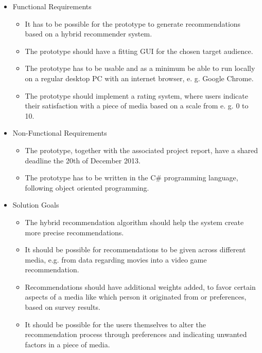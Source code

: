 \begin{itemize}
	\item Functional Requirements
	\begin{itemize}
		\item It has to be possible for the prototype to generate recommendations based on a hybrid recommender system.
		\item The prototype should have a fitting GUI for the chosen target audience.
		\item The prototype has to be usable and as a minimum be able to run locally on a regular desktop PC with an internet browser, e. g. Google Chrome.
		\item The prototype should implement a rating system, where users indicate their satisfaction with a piece of media based on a scale from e. g. 0 to 10.
	\end{itemize}
	\item Non-Functional Requirements
	\begin{itemize}
		\item The prototype, together with the associated project report, have a shared deadline the 20th of December 2013.
		\item The prototype has to be written in the C\# programming language, following object oriented programming.
	\end{itemize}
	\item Solution Goals
	\begin{itemize}
		\item The hybrid recommendation algorithm should help the system create more precise recommendations.
		\item It should be possible for recommendations to be given across different media, e.g. from data regarding movies into a video game recommendation.
		\item Recommendations should have additional weights added, to favor certain aspects of a media like which person it originated from or preferences, based on survey results.
		\item It should be possible for the users themselves to alter the recommendation process through preferences and indicating unwanted factors in a piece of media.
	\end{itemize}
\end{itemize}